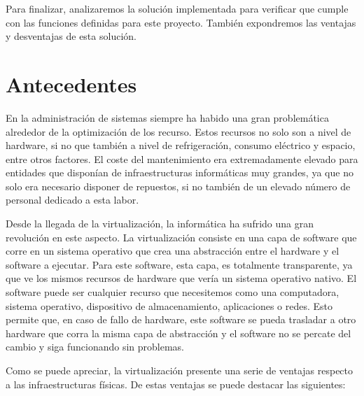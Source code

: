 \documentclass[12pt,a4paper,titlepage,twoside]{report}
\begin{document}
Para finalizar, analizaremos la solución implementada para verificar que cumple con las funciones definidas para este proyecto. También expondremos las ventajas y desventajas de esta solución. 




\chapter{Antecedentes}

En la administración de sistemas siempre ha habido una gran problemática alrededor de la optimización de los recurso. Estos recursos no solo son a nivel de hardware, si no que también a nivel de refrigeración, consumo eléctrico y espacio, entre otros factores. El coste del mantenimiento era extremadamente elevado para entidades que disponían de infraestructuras informáticas muy grandes, ya que no solo era necesario disponer de repuestos, si no también de un elevado número de personal dedicado a esta labor.
\par
Desde la llegada de la virtualización, la informática ha sufrido una gran revolución en este aspecto. La virtualización consiste en una capa de software que corre en un sistema operativo que crea una abstracción entre el hardware y el software a ejecutar. Para este software, esta capa, es totalmente transparente, ya que ve los mismos recursos de hardware que vería un sistema operativo nativo. El software puede ser cualquier recurso que necesitemos como una computadora, sistema operativo, dispositivo de almacenamiento, aplicaciones o redes. Esto permite que, en caso de fallo de hardware, este software se pueda trasladar a otro hardware que corra la misma capa de abstracción y el software no se percate del cambio y siga funcionando sin problemas. 
\par
Como se puede apreciar, la virtualización presente una serie de ventajas respecto a las infraestructuras físicas. De estas ventajas se puede destacar las siguientes:
\end{document}
